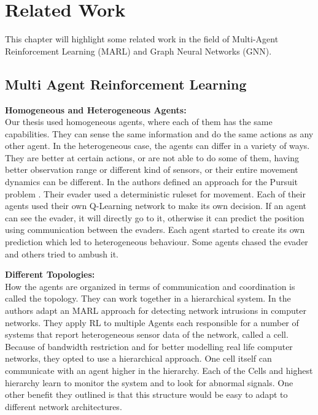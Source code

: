 
\chapter{Related Work}
\label{ch:Related Work}

This chapter will highlight some related work in the field of Multi-Agent Reinforcement Learning (MARL) and Graph Neural Networks (GNN).



\section{Multi Agent Reinforcement Learning}
\textbf{Homogeneous and Heterogeneous Agents:}\\
Our thesis used homogeneous agents, where each of them has the same capabilities. They can sense the same information and do the same actions as any other agent. In the heterogeneous case, the agents can differ in a variety of ways. They are better at certain actions, or are not able to do some of them, having better observation range or different kind of sensors, or their entire movement dynamics can be different. In \citet{ISHIWAKA2003245} the authors defined an approach for the Pursuit problem . Their evader used a deterministic ruleset for movement. Each of their agents used their own Q-Learning network to make its own decision. If an agent can see the evader, it will directly go to it, otherwise it can predict the position using communication between the evaders. Each agent started to create its own prediction which led to heterogeneous behaviour. Some agents chased the evader and others tried to ambush it.\par

\textbf{Different Topologies:} \\
How the agents are organized in terms of communication and coordination is called the topology. They can work together in a hierarchical system. In \citet{Intrusion2008} the authors adapt an MARL approach for detecting network intrusions in computer networks. They apply RL to multiple Agents each responsible for a number of systems that report heterogeneous sensor data of the network, called a cell. Because of bandwidth restriction and for better modelling real life computer networks, they opted to use a hierarchical approach. One cell itself can communicate with an agent higher in the hierarchy. Each of the Cells and highest hierarchy learn to monitor the system and to look for abnormal signals. One other benefit they outlined is that this structure would be easy to adapt to different network architectures. \par

